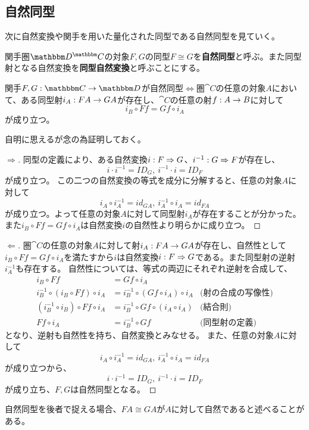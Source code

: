 \subsection{自然同型}\label{chap-7.2-natural-isomorphism}
  次に自然変換や関手を用いた量化された同型である自然同型を見ていく。
  \begin{define}\label{def-natural-isomorphism}
    関手圏$\funccat{C}{D}$の対象$F,G$の同型$F\cong G$を\textbf{自然同型}と呼ぶ。また同型射となる自然変換を\textbf{同型自然変換}と呼ぶことにする。
  \end{define}
  \begin{prop}[自然同型と対象の同型]\label{prop-isomorphic-between-objects-and-functor}
    関手$\functor{F,G}{C}{D}$が自然同型$\iff$圏$\cat{C}$の任意の対象$A$において、ある同型射$i_A:FA\rightarrow GA$が存在し、$\cat{C}$の任意の射$f:A\rightarrow B$に対して\[i_B\circ Ff=Gf\circ i_A\]が成り立つ。
  \end{prop}
  自明に思えるが念の為証明しておく。
  \begin{proof}[$\Longrightarrow$]
    同型の定義により、ある自然変換$i:F\Rightarrow G$、$i^{-1}:G\Rightarrow F$が存在し、\[i\cdot i^{-1}=ID_G,\ i^{-1}\cdot i=ID_F\]が成り立つ。
    この二つの自然変換の等式を成分に分解すると、任意の対象$A$に対して\[i_A\circ i^{-1}_A=id_{GA},\ i^{-1}_A\circ i_A=id_{FA}\]が成り立つ。よって任意の対象$A$に対して同型射$i_A$が存在することが分かった。
    また$i_B\circ Ff=Gf\circ i_A$は自然変換$i$の自然性より明らかに成り立つ。
  \end{proof}
  \begin{proof}[$\Longleftarrow$]
    圏$\cat{C}$の任意の対象$A$に対して射$i_A:FA\rightarrow GA$が存在し、自然性として$i_B\circ Ff=Gf\circ i_A$を満たすから$i$は自然変換$i:F\Rightarrow G$である。また同型射の逆射$i^{-1}_A$も存在する。
    自然性については、等式の両辺にそれぞれ逆射を合成して、
    \begin{align*}
      i_B\circ Ff &=Gf\circ i_A\\
      i^{-1}_B\circ (i_B\circ Ff)\circ i_A &=i^{-1}_B\circ(Gf\circ i_A)\circ i_A&\text{(射の合成の写像性)}\\
      (i^{-1}_B\circ i_B)\circ Ff\circ i_A &=i^{-1}_B\circ Gf\circ (i_A\circ i_A)&\text{(結合則)}\\
      Ff\circ i_A&=i^{-1}_B\circ Gf&\text{(同型射の定義)}
    \end{align*}
    となり、逆射も自然性を持ち、自然変換とみなせる。
    また、任意の対象$A$に対して\[i_A\circ i^{-1}_A=id_{GA},\ i^{-1}_A\circ i_A=id_{FA}\]が成り立つから、\[i\cdot i^{-1}=ID_G,\ i^{-1}\cdot i=ID_F\]が成り立ち、$F,G$は自然同型となる。
  \end{proof}
  自然同型を後者で捉える場合、$FA\cong GA$が$A$に対して自然であると述べることがある。

